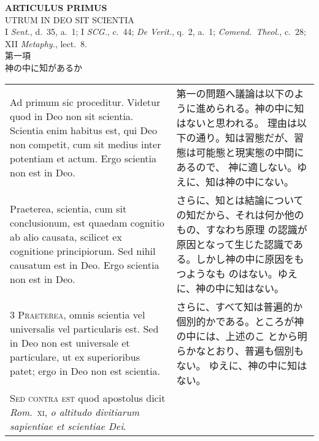 \documentclass[10pt]{jsarticle} %
\begin{document}
\newpage
{}
\begin{center}
{\Large {\bfseries ARTICULUS PRIMUS}}\\
{\large UTRUM IN DEO SIT SCIENTIA}\\
{\footnotesize I {\itshape Sent.}, d.~35, a.~1; I {\itshape SCG.}, c.~44; {\itshape De Verit.}, q.~2, a.~1; {\itshape Comend.~Theol.}, c.~28; XII {\itshape Metaphy.}, lect.~8.}\\
{\Large 第一項\\神の中に知があるか}
\end{center}

\begin{longtable}{p{21em}p{21em}}

{\huge A}{\sc d primum sic proceditur}. 
Videtur quod in Deo non sit scientia. Scientia enim habitus est, qui Deo
 non competit, cum sit medius inter potentiam et actum. Ergo scientia
 non est in Deo.

&

第一の問題へ議論は以下のように進められる。神の中に知はないと思われる。
理由は以下の通り。知は習態だが、習態は可能態と現実態の中間にあるので、
神に適しない。ゆえに、知は神の中にない。

\\

{\sc 2 Praeterea}, scientia, cum sit conclusionum, est quaedam
cognitio ab alio causata, scilicet ex cognitione principiorum. Sed
nihil causatum est in Deo. Ergo scientia non est in Deo.

&

さらに、知とは結論についての知だから、それは何か他のもの、すなわち原理
の認識が原因となって生じた認識である。しかし神の中に原因をもつようなも
のはない。ゆえに、神の中に知はない。

\\

{\scshape 3 Praeterea}, omnis scientia vel universalis vel
particularis est. Sed in Deo non est universale et particulare, ut ex
superioribus patet; ergo in Deo non est scientia.

&

さらに、すべて知は普遍的か個別的かである。ところが神の中には、上述のこ
とから明らかなとおり、普遍も個別もない。 ゆえに、神の中に知はない。

\\


{\scshape Sed contra est} quod apostolus dicit {\itshape
Rom}.~{\scshape xi}, {\itshape o altitudo divitiarum sapientiae et
scientiae Dei}.


\end{longtable}
\end{document}
